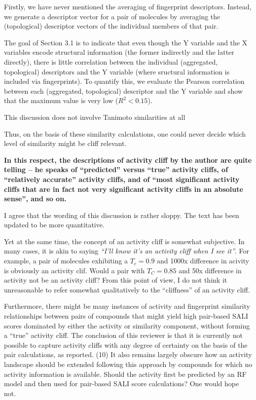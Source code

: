 \documentclass[letterpaper, 12pt]{article}
\begin{document}
Firstly, we have never mentioned the averaging of fingerprint
descriptors. Instead, we generate a descriptor vector for a pair of
molecules by averaging the (topological) descriptor vectors of the
individual members of that pair.

The goal of Section 3.1 is to indicate that even though the Y variable
and the X variables encode structural information (the former
indirectly and the latter directly), there is little correlation
between the individual (aggregated, topological) descriptors and the Y
variable (where sructural information is included via
fingerprints). To quantify this, we evaluate the Pearson correlation
between each (aggregated, topological) descriptor and the Y variable
and show that the maximum value is very low ($R^2 < 0.15$). 

This discussion does not involve Tanimoto similarities at all

 Thus, on the basis of these similarity calculations, one could never
 decide which level of similarity might be cliff relevant.

\textbf{ In this
 respect, the descriptions of activity cliff by the author are quite
 telling – he speaks of “predicted” versus “true” activity cliffs, of
 “relatively accurate” activity cliffs, and of “most significant
 activity cliffs that are in fact not very significant activity cliffs
 in an absolute sense”, and so on. }

I agree that the wording of this discussion is rather sloppy. The text
has been updated to be more quantitative. 

Yet at the same time, the concept of an activity cliff is somewhat
subjective. In many cases, it is akin to saying \emph{``I'll know it's
  an activity cliff when I see it''}. For example, a pair of molecules
exhibiting a $T_c = 0.9$ and 1000x difference in acivity is obviously
an activity clif. Would a pair with $T_C = 0.85$ and 50x difference in
activity not be an activity cliff? From this point of view, I do not
think it unreasonable to refer somewhat qualitatively to the
``cliffness'' of an activity cliff.

Furthermore, there might be many instances of activity and fingerprint similarity relationships between pairs of compounds that might yield high pair-based SALI scores dominated by either the activity or similarity component, without forming a “true” activity cliff. The conclusion of this reviewer is that it is currently not possible to capture activity cliffs with any degree of certainty on the basis of the pair calculations, as reported.
(10) It also remains largely obscure how an activity landscape should be extended following this approach by compounds for which no activity information is available. Should the activity first be predicted by an RF model and then used for pair-based SALI score calculations? One would hope not.
\end{document}
